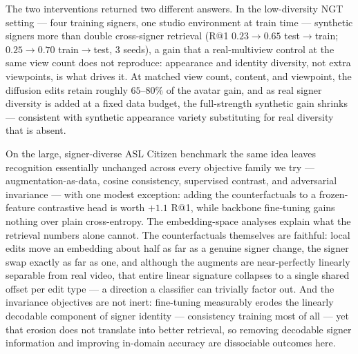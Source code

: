 The two interventions returned two different answers. In the
low-diversity NGT setting --- four training signers, one studio
environment at train time --- synthetic signers more than double
cross-signer retrieval (R@1 $0.23 \to 0.65$ test$\to$train; $0.25 \to
0.70$ train$\to$test, 3 seeds), a gain that a real-multiview control at
the same view count does not reproduce: appearance and identity
diversity, not extra viewpoints, is what drives it. At matched view
count, content, and viewpoint, the diffusion edits retain roughly
$65$--$80\%$ of the avatar gain, and as real signer diversity is added
at a fixed data budget, the full-strength synthetic gain shrinks ---
consistent with synthetic appearance variety substituting for real
diversity that is absent.

On the large, signer-diverse ASL Citizen benchmark the same idea leaves
recognition essentially unchanged across every objective family we try
--- augmentation-as-data, cosine consistency, supervised contrast, and
adversarial invariance --- with one modest exception: adding the
counterfactuals to a frozen-feature contrastive head is worth $+1.1$
R@1, while backbone fine-tuning gains nothing over plain cross-entropy.
The embedding-space analyses explain what the retrieval numbers alone
cannot. The counterfactuals themselves are faithful: local edits move an
embedding about half as far as a genuine signer change, the signer swap
exactly as far as one, and although the augments are near-perfectly
linearly separable from real video, that entire linear signature
collapses to a single shared offset per edit type --- a direction a
classifier can trivially factor out.
And the invariance objectives are not inert: fine-tuning measurably
erodes the linearly decodable component of signer identity ---
consistency training most of all --- yet that erosion does not translate
into better retrieval, so removing decodable signer information and
improving in-domain accuracy are dissociable outcomes here.

